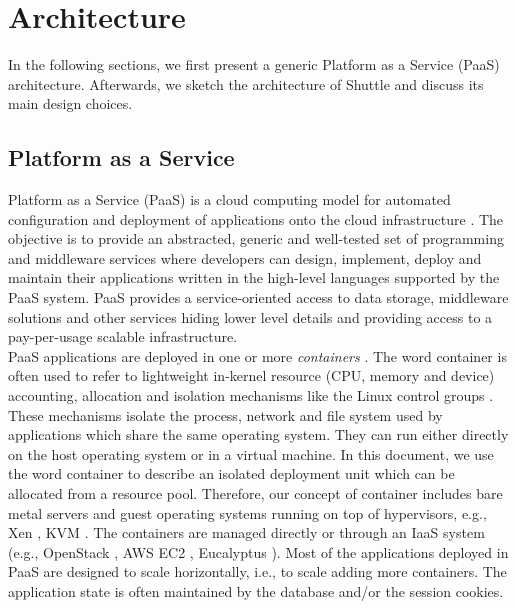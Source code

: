 \section{Architecture}
\label{sec:Architecture}
In the following sections, we first present a generic Platform as a Service (PaaS) architecture. Afterwards, we sketch the architecture of Shuttle and discuss its main design choices.\\

\subsection{Platform as a Service}
\label{sec:PaaS}
Platform as a Service (PaaS) is a cloud computing model for automated configuration and deployment of applications onto the cloud infrastructure \cite{Vaquero2008,Vaquero2011,Armbrust,Mell}. The objective is to provide an abstracted, generic and well-tested set of programming and middleware services where developers can design, implement, deploy and maintain their applications written in the high-level languages supported by the PaaS system. PaaS provides a service-oriented access to data storage, middleware solutions and other services hiding lower level details and providing access to a pay-per-usage scalable infrastructure. \\


PaaS applications are deployed in one or more \emph{containers} \cite{Lenk2009}. The word container is often used to refer to lightweight in-kernel resource (CPU, memory and device) accounting, allocation and isolation mechanisms like the Linux control groups \cite{Menage2007}. These mechanisms isolate the process, network and file system used by applications which share the same operating system. They can run either directly on the host operating system or in a virtual machine. In this document, we use the word container to describe an isolated deployment unit which can be allocated from a resource pool. Therefore, our concept of container includes bare metal servers and guest operating systems running on top of hypervisors, e.g., Xen \cite{xen}, KVM \cite{kvm}. The containers are managed directly or through an IaaS system (e.g., OpenStack \cite{openstack}, AWS EC2 \cite{aws}, Eucalyptus \cite{eucalyptus}). Most of the applications deployed in PaaS are designed to scale horizontally, i.e., to scale adding more containers. The application state is often maintained by the database and/or the session cookies.

